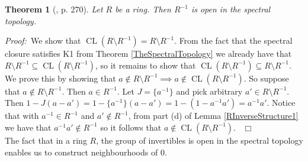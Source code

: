 \documentclass[12pt, oneside]{book}
\newtheorem{theorem}{Theorem}[subsection]
\newcommand{\proof}{{\noindent \it Proof:~}}
\newcommand{\qed}{\hfill ~$\Box$\\}
\def\CL{\operatorname{CL}}
\begin{document}
\begin{theorem}[\cite{CH3}, p. 270] \label{RInverseOpenInSpectralT}
\normalfont
\noindent Let $R$ be a ring. Then $R^{-1}$ is open in the spectral topology.

\end{theorem}

\proof \space We show that $\CL(R \setminus R^{-1}) = R \setminus R^{-1}$. From the fact that the 
spectral closure satisfies K1 from Theorem \ref{TheSpectralTopology} we already have that 
$ R \setminus R^{-1} \subseteq \CL(R \setminus R^{-1})$, so it remains to show that $\CL(R \setminus R^{-1}) \subseteq R \setminus R^{-1}$. We prove this by showing that 
$a \not \in R \setminus R^{-1} \implies a \not \in \CL(R \setminus R^{-1})$. 
So suppose that $a \not \in R \setminus R^{-1}$. Then $a \in R^{-1}$. Let $J = \{ a^{-1} \}$ and pick arbitrary $a' \in R \setminus R^{-1}$. 
Then $1-J(a-a')=1-\{ a^{-1} \}(a-a')=1-(1-a^{-1}a')=a^{-1}a'$. Notice that with  $a^{-1} \in R^{-1}$ and $a' \not \in R^{-1}$, from part (d) of Lemma \ref{RInverseStructure1} we have that $a^{-1}a' \not \in R^{-1}$ so it follows that $a \not \in \CL(R \setminus R^{-1})$. \qed

\noindent The fact that in a ring $R$, the group of invertibles is open in the spectral topology 
enables us to construct neighbourhoods of 0.
\end{document}
